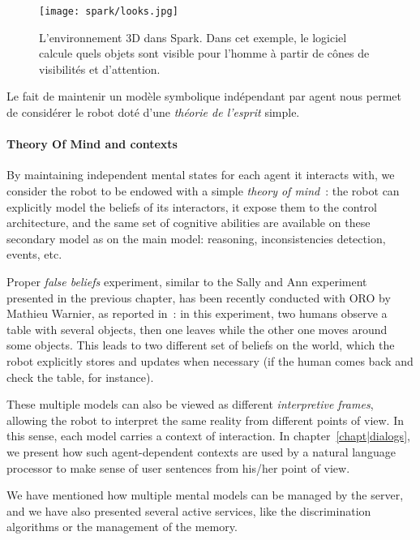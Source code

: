 \begin{figure}
\centering
  \texttt{[image: spark/looks.jpg]}

  \caption{L'environnement 3D dans {\sc Spark}. Dans cet exemple, le logiciel
  calcule quels objets sont visible pour l'homme à partir de cônes de
  visibilités et d'attention.}

  \label{fig|spark}
\end{figure}

Le fait de maintenir un modèle symbolique indépendant par agent nous permet de considérer le robot doté d'une \emph{théorie de l'esprit} simple.

\paragraph{Theory Of Mind and contexts} \label{sect|theory-of-mind}

By maintaining independent mental states for each agent it interacts with, we
consider the robot to be endowed with a simple \emph{theory of
mind}~\cite{Scassellati2002}: the robot can explicitly model the beliefs of its
interactors, it expose them to the control architecture, and the same set of
cognitive abilities are available on these secondary model as on the main
model: reasoning, inconsistencies detection, events, etc.

Proper \emph{false beliefs} experiment, similar to the Sally and Ann experiment
presented in the previous chapter, has been recently conducted with ORO
by Mathieu Warnier, as reported in~\cite{Warnier2012a}: in this experiment, two
humans observe a table with several objects, then one leaves while the other
one moves around some objects. This leads to two different set of beliefs on
the world, which the robot explicitly stores and updates when necessary (if the
human comes back and check the table, for instance).

These multiple models can also be viewed as different \emph{interpretive
frames}, allowing the robot to interpret the same reality from different points
of view. In this sense, each model carries a context of interaction.  In
chapter~\ref{chapt|dialogs}, we present how such agent-dependent contexts are
used by a natural language processor to make sense of user sentences from
his/her point of view.



We have mentioned how multiple mental models can be managed by the server, and
we have also presented several active services, like the discrimination
algorithms or the management of the memory.

